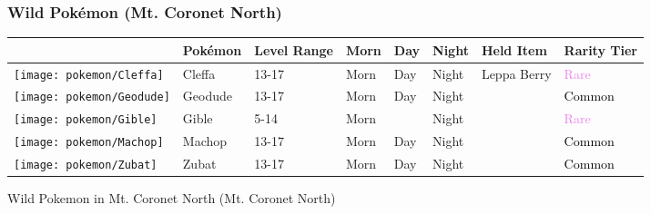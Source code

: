 \subsubsection{Wild Pokémon (Mt. Coronet North)}%
\label{ssubsec:WildPokmon(Mt.CoronetNorth)}%
\begin{longtable}{||l l l l l l l l||}%
\hline%
&Pokémon&Level Range&Morn&Day&Night&Held Item&Rarity Tier\\%
\hline%
\endhead%
\hline%
\texttt{[image: pokemon/Cleffa]}&Cleffa&13{-}17&Morn&Day&Night&Leppa Berry&\textcolor{violet}{%
Rare%
}\\%
\hline%
\texttt{[image: pokemon/Geodude]}&Geodude&13{-}17&Morn&Day&Night&&\textcolor{black}{%
Common%
}\\%
\hline%
\texttt{[image: pokemon/Gible]}&Gible&5{-}14&Morn&&Night&&\textcolor{violet}{%
Rare%
}\\%
\hline%
\texttt{[image: pokemon/Machop]}&Machop&13{-}17&Morn&Day&Night&&\textcolor{black}{%
Common%
}\\%
\hline%
\texttt{[image: pokemon/Zubat]}&Zubat&13{-}17&Morn&Day&Night&&\textcolor{black}{%
Common%
}\\%
\hline%
\end{longtable}%
\caption{Wild Pokemon in Mt. Coronet North (Mt. Coronet North)}